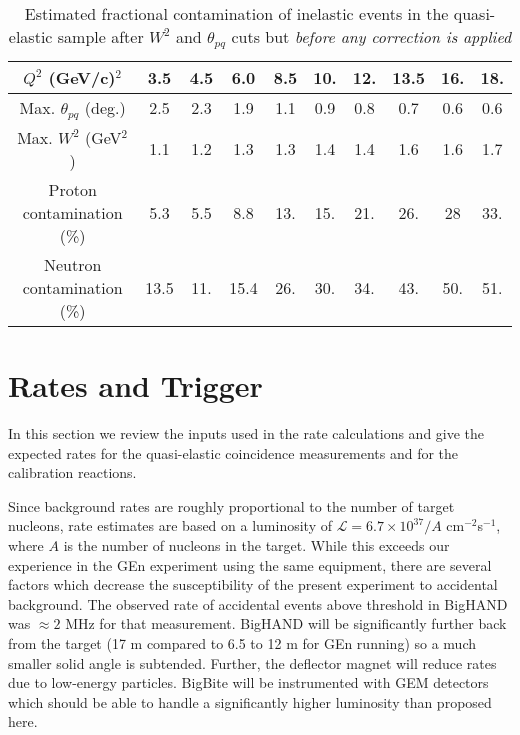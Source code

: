 \documentclass[12pt,letterpaper,oneside]{article}
\begin{document}
\begin{table}
\begin{center}
\caption{
Estimated fractional contamination of inelastic events in the
quasi-elastic sample after $W^2$ and $\theta_{pq}$ cuts but {\it before any correction
  is applied}
\label{inelastic_contam}}
\vspace{.2in}
{\begin{tabular}{|c|c|c|c|c|c|c|c|c|c|}
\hline
$Q^2$ (GeV/c)$^2$&3.5& 4.5&6.0& 8.5&10.&12.&13.5&16.&18.\\
\hline
\hline
Max. $\theta_{pq}$ (deg.)&2.5&2.3&1.9&1.1&0.9&0.8&0.7&0.6&0.6\\
\hline
Max. $W^2$ (GeV$^2$)&1.1&1.2&1.3&1.3&1.4&1.4&1.6&1.6&1.7\\
\hline
\hline
Proton contamination (\%)&5.3&5.5&8.8&13.&15.&21.&26.&28&33.\\
\hline
Neutron contamination (\%)&13.5&11.&15.4&26.&30.&34.&43.&50.&51.\\
\hline
\end{tabular}}
\end{center}
\end{table}




\section{Rates and Trigger}

\label{rates}
In this section we review the inputs used in the rate calculations and
give the expected rates for the quasi-elastic coincidence measurements
and for the calibration reactions.

Since background rates are roughly proportional to the number of
target nucleons, rate estimates are based on a luminosity of
$\mathcal{L}=6.7\times 10^{37}/A$ cm$^{-2}$s$^{-1}$, where $A$ is the number of
nucleons in the target.  While this exceeds our experience in the
GEn experiment \cite{GEn-proposal}  using the same equipment, there
are several factors which decrease the susceptibility of the present
experiment to accidental background. 
The observed rate of
accidental events above threshold in BigHAND was $\approx 2$ MHz for that
measurement.  BigHAND will be significantly further back from
the target (17 m compared to 6.5 to 12 m for GEn running) so a much
smaller solid angle is subtended. Further, the deflector magnet will
reduce rates due to low-energy particles.  BigBite will be
instrumented with GEM detectors which should be able to handle a
significantly higher luminosity than proposed here. 
\end{document}
